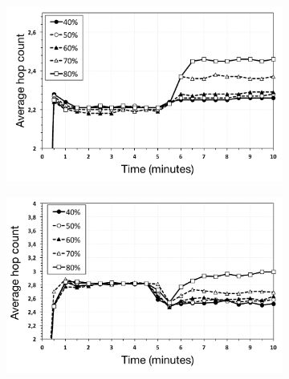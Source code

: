 
\begin{figure}
\centering
\begin{subfigure}{.5\textwidth}
  \centering
  \includegraphics[keepaspectratio=true, width=1\linewidth]{images/average_hop_count_failures_1impl}
  \caption{}
  \label{fig:average_hop_count_failures_1impl}
\end{subfigure}%
\begin{subfigure}{.5\textwidth}
  \centering
  \includegraphics[keepaspectratio=true, width=1\linewidth]{images/average_hop_count_failures_2impl}
  \caption{}
  \label{fig:average_hop_count_failures_2impl}
\end{subfigure}
\begin{subfigure}{.5\textwidth}

\end{subfigure}
\end{figure}
